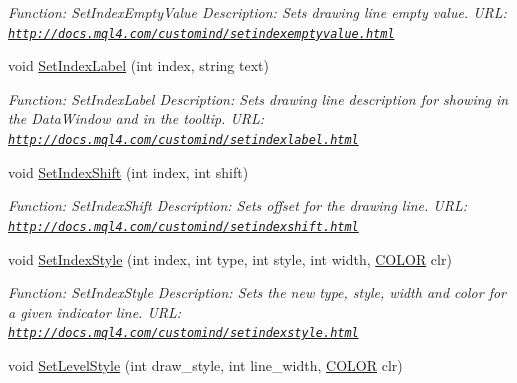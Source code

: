 \begin{DoxyCompactItemize}
\begin{DoxyCompactList}\small\item\em Function\+: Set\+Index\+Empty\+Value Description\+: Sets drawing line empty value. U\+RL\+: \href{http://docs.mql4.com/customind/setindexemptyvalue.html}{\tt http\+://docs.\+mql4.\+com/customind/setindexemptyvalue.\+html} \end{DoxyCompactList}\item 
void \hyperlink{class_m_q_l4_c_sharp_1_1_base_1_1_m_q_l_base_a2f750e4dce669dccf7652bc3d5ffc0e4}{Set\+Index\+Label} (int index, string text)
\begin{DoxyCompactList}\small\item\em Function\+: Set\+Index\+Label Description\+: Sets drawing line description for showing in the Data\+Window and in the tooltip. U\+RL\+: \href{http://docs.mql4.com/customind/setindexlabel.html}{\tt http\+://docs.\+mql4.\+com/customind/setindexlabel.\+html} \end{DoxyCompactList}\item 
void \hyperlink{class_m_q_l4_c_sharp_1_1_base_1_1_m_q_l_base_a705f9031940b34d26b382e15cef41508}{Set\+Index\+Shift} (int index, int shift)
\begin{DoxyCompactList}\small\item\em Function\+: Set\+Index\+Shift Description\+: Sets offset for the drawing line. U\+RL\+: \href{http://docs.mql4.com/customind/setindexshift.html}{\tt http\+://docs.\+mql4.\+com/customind/setindexshift.\+html} \end{DoxyCompactList}\item 
void \hyperlink{class_m_q_l4_c_sharp_1_1_base_1_1_m_q_l_base_a59cf0aa946ab9b063ded027b3d63401b}{Set\+Index\+Style} (int index, int type, int style, int width, \hyperlink{namespace_m_q_l4_c_sharp_1_1_base_1_1_enums_a79b99235c71c70f2f5207aac2ff24f1a}{C\+O\+L\+OR} clr)
\begin{DoxyCompactList}\small\item\em Function\+: Set\+Index\+Style Description\+: Sets the new type, style, width and color for a given indicator line. U\+RL\+: \href{http://docs.mql4.com/customind/setindexstyle.html}{\tt http\+://docs.\+mql4.\+com/customind/setindexstyle.\+html} \end{DoxyCompactList}\item 
void \hyperlink{class_m_q_l4_c_sharp_1_1_base_1_1_m_q_l_base_abac8acc7ebd00209d0b25c95223e065d}{Set\+Level\+Style} (int draw\+\_\+style, int line\+\_\+width, \hyperlink{namespace_m_q_l4_c_sharp_1_1_base_1_1_enums_a79b99235c71c70f2f5207aac2ff24f1a}{C\+O\+L\+OR} clr)

\end{DoxyCompactItemize}
